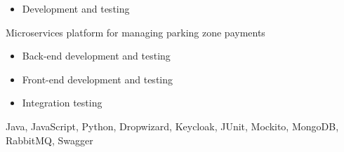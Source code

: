 \begin{experiences}
{                        \begin{itemize}
                            \item Development and testing
                        \end{itemize}
                        Microservices platform for managing parking zone payments
                        \begin{itemize}
                            \item Back-end development and testing
                            \item Front-end development and testing
                            \item Integration testing
                        \end{itemize}
                    }
                    {Java, JavaScript, Python, Dropwizard, Keycloak, JUnit, Mockito, MongoDB, RabbitMQ, Swagger}
\end{experiences}
